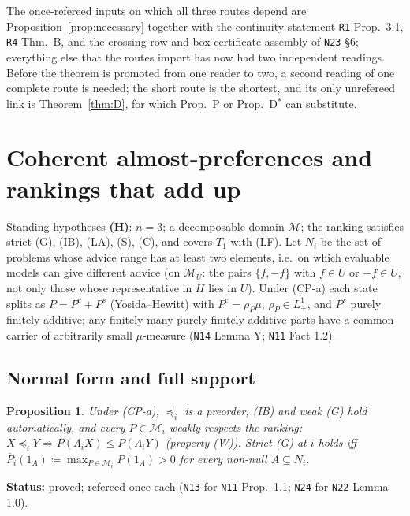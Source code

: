 \documentclass[11pt]{article}
\newtheorem{proposition}[theorem]{Proposition}
\theoremstyle{definition}
\theoremstyle{remark}
\newcommand{\M}{\mathcal M}
\newcommand{\up}{\overline{P}}
\newcommand{\src}[1]{\texttt{#1}}
\newcommand{\status}[1]{\par\smallskip\noindent\textbf{Status:} #1\par\smallskip}
\begin{document}
The once-refereed inputs on which all three routes depend are Proposition~\ref{prop:necessary} together with the continuity statement \src{R1} Prop.~3.1, \src{R4} Thm.~B, and the crossing-row and box-certificate assembly of \src{N23} \S6; everything else that the routes import has now had two independent readings. Before the theorem is promoted from one reader to two, a second reading of one complete route is needed; the short route is the shortest, and its only unrefereed link is Theorem~\ref{thm:D}, for which Prop.~P or Prop.~D$^*$ can substitute.

\section{Coherent almost-preferences and rankings that add up}\label{sec:cp}

Standing hypotheses \textbf{(H)}: $n=3$; a decomposable domain $\M$; the ranking satisfies strict (G), (IB), (LA), (S), (C), and covers $T_1$ with (LF). Let $N_i$ be the set of problems whose advice range has at least two elements, i.e.\ on which evaluable models can give different advice (on $\M_U$: the pairs $\{f,-f\}$ with $f\in U$ or $-f\in U$, not only those whose representative in $H$ lies in $U$). Under (CP-a) each state splits as $P=P^c+P^s$ (Yosida--Hewitt) with $P^c=\rho_P\mu$, $\rho_P\in L^1_+$, and $P^s$ purely finitely additive; any finitely many purely finitely additive parts have a common carrier of arbitrarily small $\mu$-measure (\src{N14} Lemma Y; \src{N11} Fact 1.2).

\subsection{Normal form and full support}

\begin{proposition}\label{prop:normalform}
Under (CP-a), $\preceq_i$ is a preorder, (IB) and weak (G) hold automatically, and every $P\in\M_i$ weakly respects the ranking: $X\preceq_iY\Rightarrow P(\Lambda_iX)\le P(\Lambda_iY)$ (property (W)). Strict (G) at $i$ holds iff $\up_i(1_A)\coloneqq\max_{P\in\M_i}P(1_A)>0$ for every non-null $A\subseteq N_i$.
\end{proposition}
\status{proved; refereed once each (\src{N13} for \src{N11} Prop.~1.1; \src{N24} for \src{N22} Lemma 1.0).}
\end{document}
